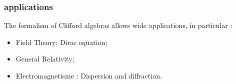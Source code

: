 \label{applications}
\begin{frame}\frametitle{applications}

The formalism of Clifford algebras allows wide applications, in particular :

\begin{itemize}
 \item
 Field Theory: Dirac equation;
 \item 
General Relativity;
\item 
Electromagnetisme : Dispersion and diffraction. 
  

\end{itemize}


\end{frame}

